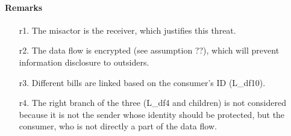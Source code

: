 \paragraph{Remarks}
\begin{enumerate}
	\item[r1.] The misactor is the receiver, which justifies this threat.
	\item[r2.] The data flow is encrypted (see assumption ??), which will prevent
	information disclosure to outsiders. %
	\item[r3.] Different bills are linked based on the consumer's ID (L\_df10). 
	\item[r4.] The right branch of the three (L\_df4 and children) is not
	considered because it is not the sender whose identity should be protected, but the
	consumer, who is not directly a part of the data flow.
\end{enumerate}
